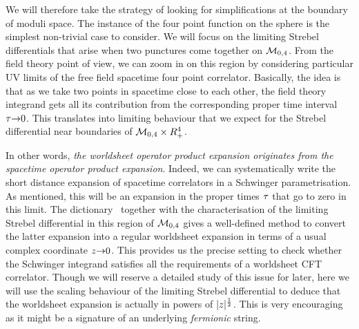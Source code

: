 We will therefore take the strategy of looking for simplifications 
at the boundary of moduli space. The instance of the four 
point function on the sphere 
is the simplest non-trivial case to consider. We will 
focus on the limiting Strebel differentials that arise when two 
punctures come together on ${\cal M}_{0,4}$. 
From the field theory point of view, 
we can zoom in on this region by considering 
particular UV limits of the free field spacetime four point correlator. 
Basically, the idea is that as we take two points in spacetime 
close to each other, the field theory integrand gets all its
contribution from the corresponding proper time interval ${\tau}{\rightarrow} 0$. This
translates into limiting behaviour that we expect for the Strebel 
differential near boundaries of ${\cal M}_{0,4}\times R_+^4$.

In other words, {\it the worldsheet operator product expansion
originates from the spacetime
operator product expansion}. Indeed, we can systematically
write the short distance expansion of spacetime correlators 
in a Schwinger parametrisation. As mentioned, this will be an expansion 
in the proper times ${\tau}$ that go to zero in this limit. The dictionary  
\dic\ together with the characterisation of the limiting Strebel
differential in this region of ${\cal M}_{0,4}$ gives a well-defined
method to convert the latter expansion into a regular worldsheet expansion 
in terms of a usual complex coordinate $z{\rightarrow} 0$. This provides us the precise 
setting to check whether the Schwinger integrand satisfies all the
requirements of a worldsheet CFT correlator. 
Though we will reserve a  
detailed study of this issue for later, here 
we will use the scaling behaviour of the limiting Strebel differential 
to deduce that the worldsheet expansion is actually in powers of  
$|z|^{1 \over 2}$. This is very encouraging as it might be a signature of 
an underlying {\it fermionic} string.   


